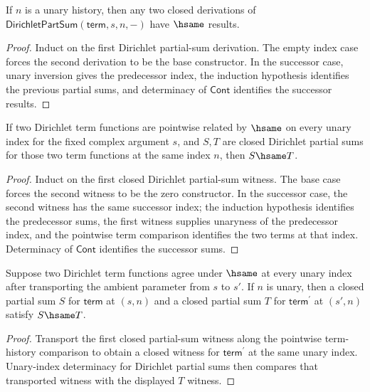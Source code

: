 \begin{lemma}
\label{lem:dirichlet-part-sum-unary-index-deterministic}
If $n$ is a unary history, then any two closed derivations of
$\mathsf{DirichletPartSum}(\mathsf{term},s,n,-)$ have $\hsame$ results.
\end{lemma}
\begin{proof}
Induct on the first Dirichlet partial-sum derivation. The empty index case
forces the second derivation to be the base constructor. In the successor case,
unary inversion gives the predecessor index, the induction hypothesis
identifies the previous partial sums, and determinacy of $\mathsf{Cont}$
identifies the successor results.
\end{proof}

\begin{lemma}
\label{lem:dirichlet-part-sum-term-hsame-deterministic}
If two Dirichlet term functions are pointwise related by \(\hsame\) on every
unary index for the fixed complex argument \(s\), and \(S,T\) are closed
Dirichlet partial sums for those two term functions at the same index \(n\),
then \(S\hsame T\).
\end{lemma}
\begin{proof}
Induct on the first closed Dirichlet partial-sum witness. The base case forces
the second witness to be the zero constructor. In the successor case, the second
witness has the same successor index; the induction hypothesis identifies the
predecessor sums, the first witness supplies unaryness of the predecessor
index, and the pointwise term comparison identifies the two terms at that
index. Determinacy of \(\mathsf{Cont}\) identifies the successor sums.
\end{proof}

\begin{lemma}
\label{thm:dirichlet-partsum-term-hsame-transport-deterministic}
Suppose two Dirichlet term functions agree under $\hsame$ at every unary index
after transporting the ambient parameter from $s$ to $s'$. If $n$ is unary,
then a closed partial sum $S$ for $\mathsf{term}$ at $(s,n)$ and a closed
partial sum $T$ for $\mathsf{term}^{\prime}$ at $(s',n)$ satisfy $S\hsame T$.
\end{lemma}
\begin{proof}
Transport the first closed partial-sum witness along the pointwise
term-history comparison to obtain a closed witness for $\mathsf{term}^{\prime}$ at
the same unary index. Unary-index determinacy for Dirichlet partial sums then
compares that transported witness with the displayed $T$ witness.
\end{proof}

